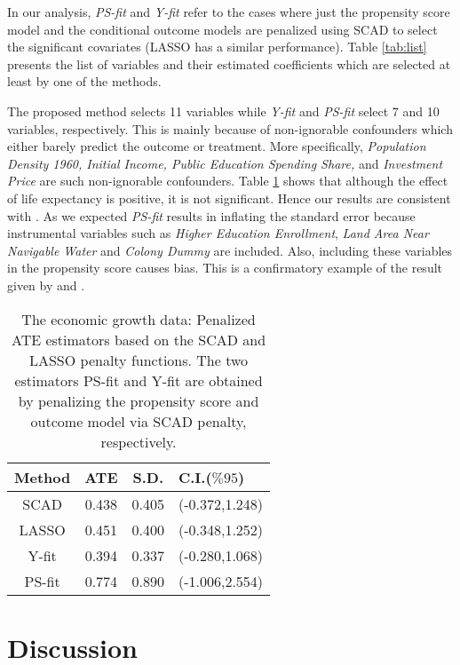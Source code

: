 \documentclass[11pt]{statsoc}
\begin{document}
In our analysis, {\it{PS-fit}} and {\it{Y-fit}} refer to the cases where just the propensity score model and the conditional outcome models are penalized using SCAD to select the significant covariates (LASSO has a similar performance). 
Table \ref{tab:list} presents the list of variables and their estimated coefficients which are selected at least by one of the methods.

The proposed method selects 11 variables while {\it Y-fit} and {\it PS-fit} select 7 and 10 variables, respectively. This is mainly because of non-ignorable confounders which  either barely predict the outcome or treatment. More specifically, {\it Population Density 1960,   Initial Income, Public Education Spending Share,} and {\it Investment Price} are such non-ignorable confounders. 
Table \ref{tab:gdata} shows that although  the effect of life expectancy is positive, it is not significant.  Hence our results are consistent with \cite{acemoglu2006disease}. As we expected {\it PS-fit} results in inflating the standard error because  instrumental variables such as {\it Higher Education Enrollment}, {\it Land Area Near Navigable Water} and {\it Colony Dummy} are included. Also, including these variables in the propensity score causes bias. This is a confirmatory example of the result given by  \cite{de2011covariate} and \cite{abadie2006large}.

\begin{table}
\caption{The economic growth data: Penalized ATE estimators based on the SCAD and LASSO penalty functions. The two estimators PS-fit and Y-fit are obtained by penalizing the propensity score and outcome model via SCAD penalty, respectively.  }\centering
\begin{tabular}{|c|ccl|} \hline
  Method   & ATE & S.D.  & C.I.($\%95$) \\ \hline
SCAD &0.438 &0.405& (-0.372,1.248)\\
LASSO &0.451 &0.400&(-0.348,1.252) \\
Y-fit &0.394 &0.337& (-0.280,1.068) \\
PS-fit &0.774 &0.890&(-1.006,2.554)\\ \hline
\end{tabular}
\label{tab:gdata}
\end{table}

\section{Discussion} \label{sec:conclude}
\end{document}
